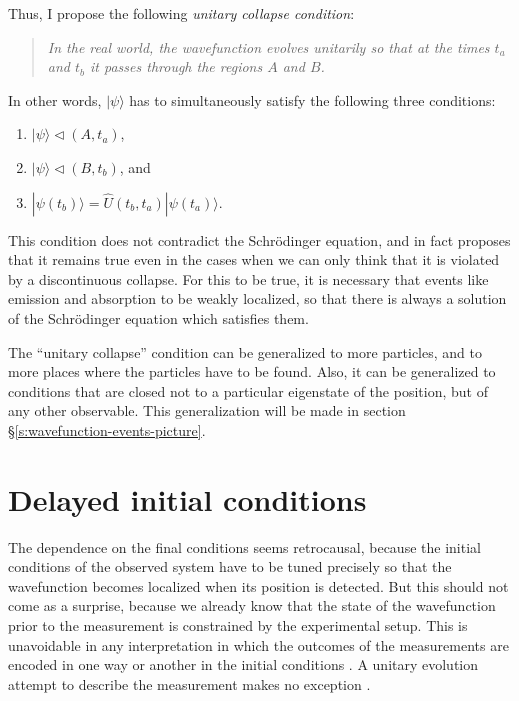 \documentclass[11pt]{amsart}
\theoremstyle{definition}
\theoremstyle{plain}
\begin{document}
Thus, I propose the following \emph{unitary collapse condition}:
\begin{quote} 
\label{condition:unitary_collapse}
\emph{In the real world, the wavefunction evolves unitarily so that at the times $t_a$ and $t_b$ it passes through the regions $A$ and $B$.}
\end{quote}

In other words, $|{\psi}\rangle$ has to simultaneously satisfy the following three conditions:
\begin{enumerate}
	\item 
$|{\psi}\rangle\triangleleft(A,t_a)$,
	\item 
$|{\psi}\rangle\triangleleft(B,t_b)$, and 
	\item 
$|{\psi(t_b)}\rangle=\hat U(t_b,t_a)|{\psi(t_a)}\rangle$.
\end{enumerate}

This condition does not contradict the Schr\"odinger equation, and in fact proposes that it remains true even in the cases when we can only think that it is violated by a discontinuous collapse. For this to be true, it is necessary that events like emission and absorption to be weakly localized, so that there is always a solution of the Schr\"odinger equation which satisfies them.

The ``unitary collapse'' condition can be generalized to more particles, and to more places where the particles have to be found. Also, it can be generalized to conditions that are closed not to a particular eigenstate of the position, but of any other observable. This generalization will be made in section \S\ref{s:wavefunction-events-picture}.



\section{Delayed initial conditions}
\label{s:delayed_initial_conditions}


The dependence on the final conditions seems retrocausal, because the initial conditions of the observed system have to be tuned precisely so that the wavefunction becomes localized when its position is detected. But this should not come as a surprise, because we already know that the state of the wavefunction prior to the measurement is constrained by the experimental setup. This is unavoidable in any interpretation in which the outcomes of the measurements are encoded in one way or another in the initial conditions \cite{Bel66,Bel64,KochenSpecker1967HiddenVariables}. A unitary evolution attempt to describe the measurement makes no exception \cite{Sto12QMb}.
\end{document}
